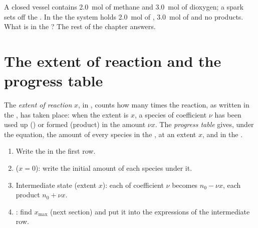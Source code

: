 \begin{example}\label{ex:g10:reaction-progress-table:methane}
A closed vessel contains \qty{2.0}{mol} of methane and \qty{3.0}{mol} of
dioxygen; a spark sets off the 
. In the  the system holds
\qty{2.0}{mol} of , \qty{3.0}{mol} of  and no
products. What is in the ? The rest of the chapter answers.
\end{example}

\section{The extent of reaction and the progress table}

\begin{definition}\label{def:g10:reaction-progress-table:extent}
The \emph{extent of reaction} $x$, in ,
counts how many times the reaction, as written in the , has taken place: when the extent is $x$, a species of
coefficient $\nu$ has been used up () or formed (product) in the
amount $\nu x$. The \emph{progress table} gives,
under the equation, the amount of every species in the ,
at an extent $x$, and in the .
\end{definition}

\begin{method}\label{met:g10:reaction-progress-table:fill}
\begin{enumerate}
  \item Write the  in the first row.
  \item {} ($x = 0$): write the initial amount of each
        species under it.
  \item Intermediate state (extent $x$): each  of coefficient
        $\nu$ becomes $n_0 - \nu x$, each product $n_0 + \nu x$.
  \item {}: find $x_{\max}$ (next section) and put it into the
        expressions of the intermediate row.
\end{enumerate}
\end{method}

